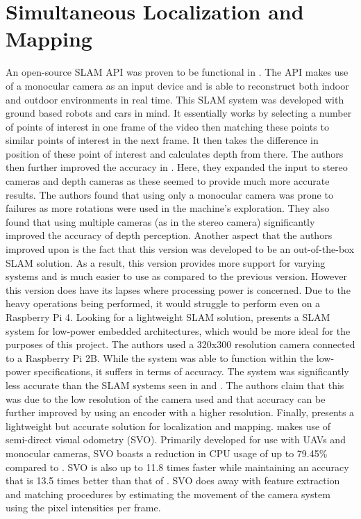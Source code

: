 \documentclass[english]{upeeei}
\begin{document}
\section{Simultaneous Localization and Mapping}
An open-source SLAM API was proven to be functional in \cite{OrbSlam1}. The API makes use of a monocular camera as an
input device and is able to reconstruct both indoor and outdoor environments in real time. This SLAM system was developed
with ground based robots and cars in mind. It essentially works by selecting a number of points of interest in one frame
of the video then matching these points to similar points of interest in the next frame. It then takes the difference in
position of these point of interest and calculates depth from there. The authors then further improved the accuracy in
\cite{OrbSlam2}. Here, they expanded the input to stereo cameras and depth cameras as these seemed to provide much more
accurate results. The authors found that using only a monocular camera was prone to failures as more rotations were used
in the machine's exploration. They also found that using multiple cameras (as in the stereo camera) significantly
improved the accuracy of depth perception. Another aspect that the authors improved upon is the fact that this version
was developed to be an out-of-the-box SLAM solution. As a result, this version provides more support for varying systems
and is much easier to use as compared to the previous version. However this version does have its lapses where processing
power is concerned. Due to the heavy operations being performed, it would struggle to perform even on a Raspberry Pi 4. 
Looking for a lightweight SLAM solution, \cite{FastSlam2} presents a SLAM system for low-power embedded architectures,
which would be more ideal for the purposes of this project. The authors used a 320x300 resolution camera connected to a
Raspberry Pi 2B. While the system was able to function within the low-power specifications, it suffers in terms of
accuracy. The system was significantly less accurate than the SLAM systems seen in \cite{OrbSlam1} and \cite{OrbSlam2}.
The authors claim that this was due to the low resolution of the camera used and that accuracy can be further improved
by using an encoder with a higher resolution. Finally, \cite{SVO2017} presents a lightweight but accurate solution for
localization and mapping. \cite{SVO2017} makes use of semi-direct visual odometry (SVO). Primarily developed for use with
UAVs and monocular cameras, SVO boasts a reduction in CPU usage of up to 79.45\% compared to \cite{OrbSlam2}. SVO is also
up to 11.8 times faster while maintaining an accuracy that is 13.5 times better than that of \cite{OrbSlam2}. SVO does 
away with feature extraction and matching procedures by estimating the movement of the camera system using the pixel
intensities per frame.
\end{document}
